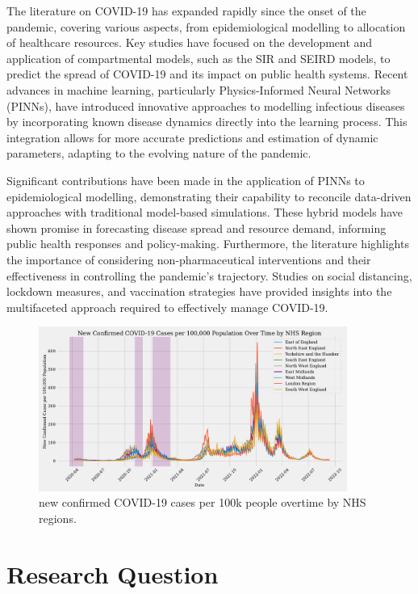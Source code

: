 \documentclass[12pt]{article}
\begin{document}
The literature on COVID-19 has expanded rapidly since the onset of the pandemic, covering various aspects, from epidemiological modelling to allocation of healthcare resources. Key studies have focused on the development and application of compartmental models, such as the SIR and SEIRD models, to predict the spread of COVID-19 and its impact on public health systems. Recent advances in machine learning, particularly Physics-Informed Neural Networks (PINNs), have introduced innovative approaches to modelling infectious diseases by incorporating known disease dynamics directly into the learning process. This integration allows for more accurate predictions and estimation of dynamic parameters, adapting to the evolving nature of the pandemic.

Significant contributions have been made in the application of PINNs to epidemiological modelling, demonstrating their capability to reconcile data-driven approaches with traditional model-based simulations. These hybrid models have shown promise in forecasting disease spread and resource demand, informing public health responses and policy-making. Furthermore, the literature highlights the importance of considering non-pharmaceutical interventions and their effectiveness in controlling the pandemic's trajectory. Studies on social distancing, lockdown measures, and vaccination strategies have provided insights into the multifaceted approach required to effectively manage COVID-19.


\begin{figure}[h]
    \centering
    \includegraphics[width=0.9\textwidth]{"images/new_confirmed_per_100k.pdf"}
    \caption{new confirmed COVID-19 cases per 100k people overtime by NHS regions.}
    \label{fig:new_confirmed_per_100k}
\end{figure}
\section{Research Question}
\end{document}
